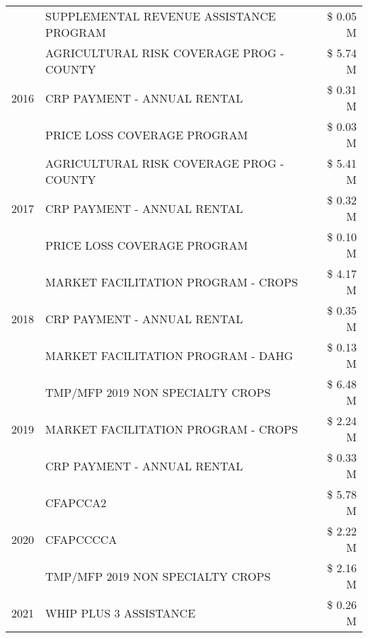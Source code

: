 \begin{tabular}{llr}
 & SUPPLEMENTAL REVENUE ASSISTANCE PROGRAM & \$ 0.05 M \\
\cline{1-3}
\multirow[t]{3}{*}{2016} & AGRICULTURAL RISK COVERAGE PROG - COUNTY      & \$ 5.74 M \\
 & CRP PAYMENT - ANNUAL RENTAL                   & \$ 0.31 M \\
 & PRICE LOSS COVERAGE PROGRAM                   & \$ 0.03 M \\
\cline{1-3}
\multirow[t]{3}{*}{2017} & AGRICULTURAL RISK COVERAGE PROG - COUNTY & \$ 5.41 M \\
 & CRP PAYMENT - ANNUAL RENTAL & \$ 0.32 M \\
 & PRICE LOSS COVERAGE PROGRAM & \$ 0.10 M \\
\cline{1-3}
\multirow[t]{3}{*}{2018} & MARKET FACILITATION PROGRAM - CROPS & \$ 4.17 M \\
 & CRP PAYMENT - ANNUAL RENTAL & \$ 0.35 M \\
 & MARKET FACILITATION PROGRAM - DAHG & \$ 0.13 M \\
\cline{1-3}
\multirow[t]{3}{*}{2019} & TMP/MFP 2019 NON SPECIALTY CROPS & \$ 6.48 M \\
 & MARKET FACILITATION PROGRAM - CROPS & \$ 2.24 M \\
 & CRP PAYMENT - ANNUAL RENTAL & \$ 0.33 M \\
\cline{1-3}
\multirow[t]{3}{*}{2020} & CFAPCCA2 & \$ 5.78 M \\
 & CFAPCCCCA & \$ 2.22 M \\
 & TMP/MFP 2019 NON SPECIALTY CROPS & \$ 2.16 M \\
\cline{1-3}
2021 & WHIP PLUS 3 ASSISTANCE & \$ 0.26 M \\
\cline{1-3}
\bottomrule
\end{tabular}
